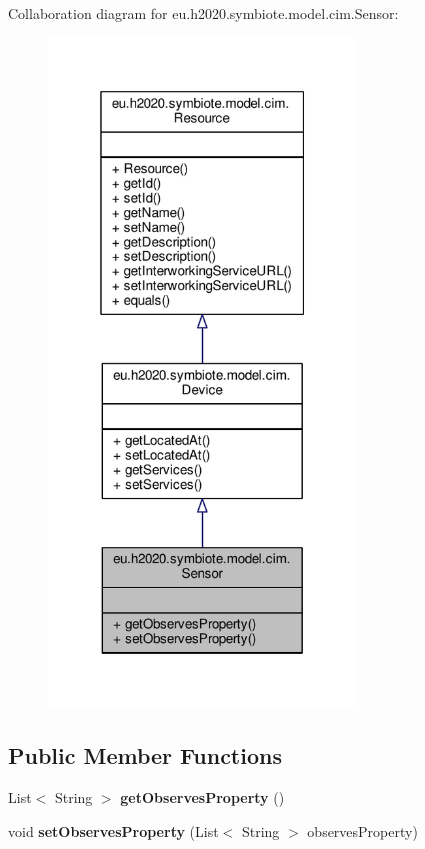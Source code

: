 Collaboration diagram for eu.\+h2020.\+symbiote.\+model.\+cim.\+Sensor\+:
\nopagebreak
\begin{figure}[H]
\begin{center}
\leavevmode
\includegraphics[width=232pt]{classeu_1_1h2020_1_1symbiote_1_1model_1_1cim_1_1Sensor__coll__graph}
\end{center}
\end{figure}
\subsection*{Public Member Functions}
\begin{DoxyCompactItemize}
\item 
\mbox{\label{classeu_1_1h2020_1_1symbiote_1_1model_1_1cim_1_1Sensor_aba93257ef63a8a0ba5be3557532b4c02}} 
List$<$ String $>$ {\bfseries get\+Observes\+Property} ()
\item 
\mbox{\label{classeu_1_1h2020_1_1symbiote_1_1model_1_1cim_1_1Sensor_a1f7116596d4ca0c0e65e79c3f4e1bfc8}} 
void {\bfseries set\+Observes\+Property} (List$<$ String $>$ observes\+Property)
\end{DoxyCompactItemize}


